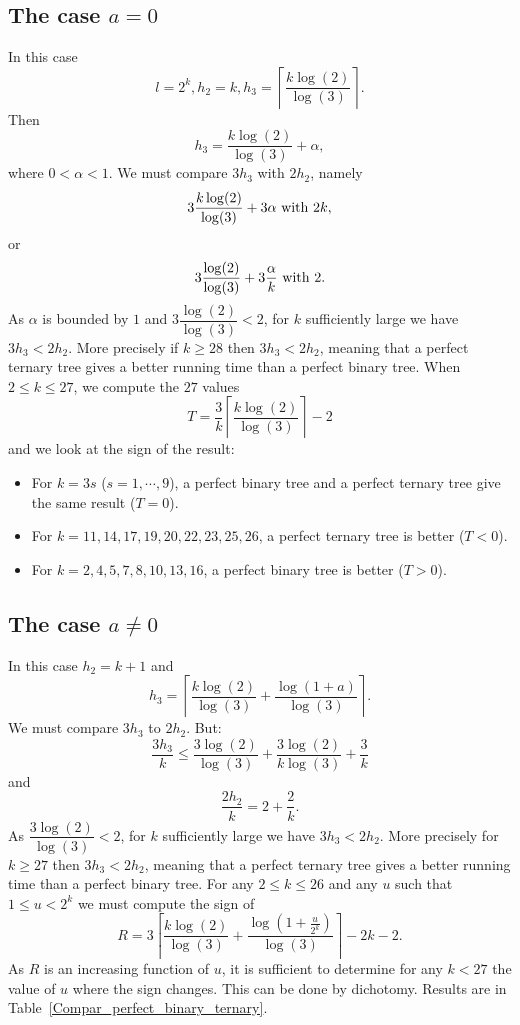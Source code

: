 \documentclass{llncs}
\begin{document}
\subsection{The case $a=0$}
In this case 
\[ l=2^k, h_2=k,  
h_3=\left\lceil \frac{k\log(2)}{\log(3)}\right\rceil.\]
Then 
\[h_3=\frac{k\log(2)}{\log(3)}+\alpha,\]
where $0<\alpha <1$.
We must compare 
$3h_3$ with $2 h_2$, namely
\[3\frac{k\log(2)}{\log(3)}+3 \alpha \hbox{ with } 2k,\]
or
\[3 \frac{\log(2)}{\log(3)}+3 \frac{\alpha}{k} \hbox{ with } 2.\]
As $\alpha$ is bounded by $1$ and $3 \dfrac{\log(2)}{\log(3)} <2$, for $k$ sufficiently large
we have $3h_3<2h_2$.
More precisely if $k \geq 28$ then $3h_3<2h_2$, meaning that a perfect ternary tree gives a better running time than a perfect binary tree.
When $2\leq k \leq 27$, we compute the $27$ values 
\[T=\frac{3}{k}\left\lceil \frac{k\log(2)}{\log(3)}\right\rceil - 2\]
and we look at the sign of the result: 
\begin{itemize}
\item For $k=3 s$ ($s=1, \cdots,9$), a perfect binary tree and a perfect ternary tree give the same result ($T=0$).
\item For $k=11,14,17,19,20,22,23,25,26$,  a perfect ternary tree is better ($T<0$).
\item For $k=2,4,5,7,8,10,13,16$, a perfect binary tree is better ($T>0$).
\end{itemize}

\subsection{The case $a \neq 0$}
In this case $h_2=k+1$ and 
\[h_3= \left\lceil \frac{k\log(2)}{\log(3)}+\frac{\log(1+a)}{\log(3)}\right\rceil.\]
We must compare $3h_3$ to $2h_2$.
But:
\[\frac{3h_3}{k} \leq \frac{3\log(2)}{\log(3)}+\frac{3\log(2)}{k\log(3)} +\frac{3}{k}\]
and 
\[\frac{2h_2}{k}=2+\frac{2}{k}.\]
As $\dfrac{3\log(2)}{\log(3)}<2$, for $k$ sufficiently large
we have $3h_3<2h_2$.
More precisely for $k \geq 27$ then $3h_3 <2h_2$, meaning that a perfect ternary tree gives a better running time than a 
perfect binary tree. For any $2 \leq k \leq 26$ and any $u$
such that $1 \leq u < 2^k$ we must compute the sign of
\[R=3\left\lceil \frac{k\log(2)}{\log(3)}+\frac{\log\left(1+\frac{u}{2^k}\right)}{\log(3)}\right\rceil-2k-2.\]
As $R$ is an increasing function of $u$, it is sufficient to determine for any $k<27$
the value of $u$ where the sign changes. This can be done by dichotomy. Results are in Table~\ref{Compar_perfect_binary_ternary}.
\end{document}
